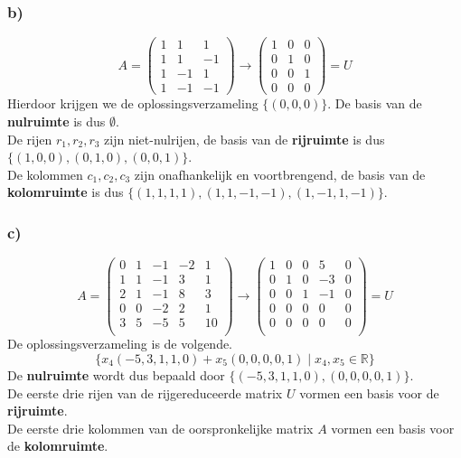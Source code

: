 \documentclass[lineaire_algebra_oplossingen.tex]{subfiles}
\begin{document}
\subsubsection*{b)}
\[
A =
\begin{pmatrix}
  1 & 1 & 1\\
  1 & 1 & -1\\
  1 & -1 & 1\\
  1 & -1 & -1
\end{pmatrix}
\longrightarrow
\begin{pmatrix}
  1 & 0 & 0\\
  0 & 1 & 0\\
  0 & 0 & 1\\
  0 & 0 & 0
\end{pmatrix}
= U
\]
Hierdoor krijgen we de oplossingsverzameling $\{(0,0,0)\}$. De basis van de \textbf{nulruimte} is dus $\emptyset$.\\
De rijen $r_1, r_2, r_3$ zijn niet-nulrijen, de basis van de \textbf{rijruimte} is dus $\{(1,0,0), (0,1,0), (0,0,1)\}$.\\
De kolommen $c_1, c_2, c_3$ zijn onafhankelijk en voortbrengend, de basis van de \textbf{kolomruimte} is dus $\{(1,1,1,1), (1,1,-1,-1), (1,-1,1,-1)\}$.

\subsubsection*{c)}
\[
A =
\begin{pmatrix}
0 & 1 & -1 &  -2 & 1 \\
1 & 1 & -1 & 3   & 1 \\
2 & 1 & -1 & 8   & 3 \\
0 & 0 & -2 & 2   & 1 \\
3 & 5 & -5 & 5   & 10\\
\end{pmatrix}
\longrightarrow
\begin{pmatrix}
1 & 0 & 0 & 5 & 0 \\
0 & 1 & 0 & -3& 0 \\
0 & 0 & 1 & -1& 0 \\
0 & 0 & 0 & 0 & 0 \\
0 & 0 & 0 & 0 & 0 \\
\end{pmatrix}
= U
\]
De oplossingsverzameling is de volgende.
\[
\{ x_4(-5,3,1,1,0) + x_5(0,0,0,0,1) \mid x_4, x_5 \in \mathbb{R}\}
\]
De \textbf{nulruimte} wordt dus bepaald door $\{ (-5,3,1,1,0) , (0,0,0,0,1) \}$.\\
De eerste drie rijen van de rijgereduceerde matrix $U$ vormen een basis voor de \textbf{rijruimte}.\\
De eerste drie kolommen van de oorspronkelijke matrix $A$ vormen een basis voor de \textbf{kolomruimte}.
\end{document}
